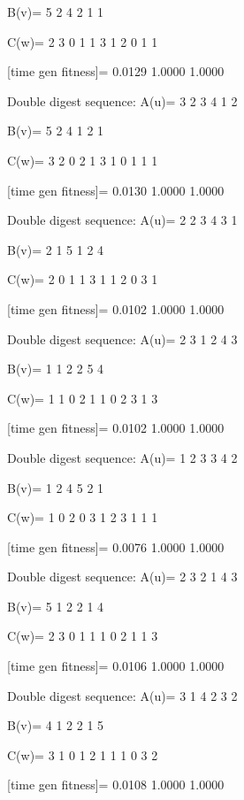 B(v)=
     5     2     4     2     1     1

C(w)=
     2     3     0     1     1     3     1     2     0     1     1

[time gen fitness]=
    0.0129    1.0000    1.0000

Double digest sequence:
A(u)=
     3     2     3     4     1     2

B(v)=
     5     2     4     1     2     1

C(w)=
     3     2     0     2     1     3     1     0     1     1     1

[time gen fitness]=
    0.0130    1.0000    1.0000

Double digest sequence:
A(u)=
     2     2     3     4     3     1

B(v)=
     2     1     5     1     2     4

C(w)=
     2     0     1     1     3     1     1     2     0     3     1

[time gen fitness]=
    0.0102    1.0000    1.0000

Double digest sequence:
A(u)=
     2     3     1     2     4     3

B(v)=
     1     1     2     2     5     4

C(w)=
     1     1     0     2     1     1     0     2     3     1     3

[time gen fitness]=
    0.0102    1.0000    1.0000

Double digest sequence:
A(u)=
     1     2     3     3     4     2

B(v)=
     1     2     4     5     2     1

C(w)=
     1     0     2     0     3     1     2     3     1     1     1

[time gen fitness]=
    0.0076    1.0000    1.0000

Double digest sequence:
A(u)=
     2     3     2     1     4     3

B(v)=
     5     1     2     2     1     4

C(w)=
     2     3     0     1     1     1     0     2     1     1     3

[time gen fitness]=
    0.0106    1.0000    1.0000

Double digest sequence:
A(u)=
     3     1     4     2     3     2

B(v)=
     4     1     2     2     1     5

C(w)=
     3     1     0     1     2     1     1     1     0     3     2

[time gen fitness]=
    0.0108    1.0000    1.0000

